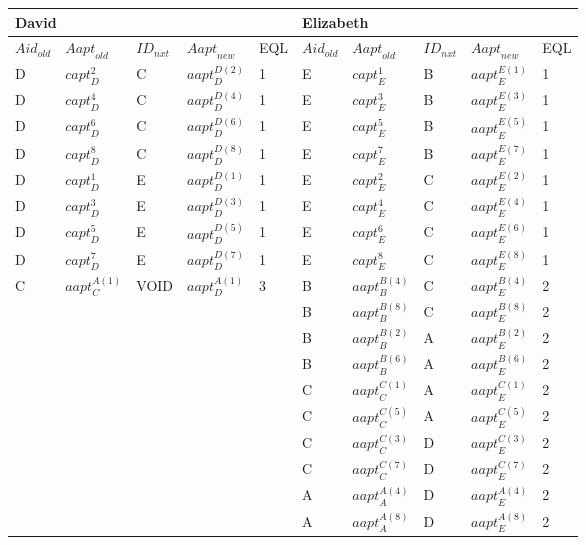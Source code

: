 \begin{tabular}{|p{0.4in}|p{0.5in}|p{0.3in}|p{0.5in}|p{0.3in}|p{0.4in}|p{0.5in}|p{0.3in}|p{0.5in}|p{0.3in}|} \hline 
\multicolumn{5}{|p{1in}|}{David} & \multicolumn{5}{|p{1.9in}|}{Elizabeth} \\ \hline 
${Aid}_{old}$ & ${Aapt}_{old}$ & ${ID}_{nxt}$ & ${Aapt}_{new}$ & EQL & ${Aid}_{old}$ & ${Aapt}_{old}$ & ${ID}_{nxt}$ & ${Aapt}_{new}$ & EQL \\ \hline 
D & ${capt}^2_D$ & C & ${aapt}^{D\left(2\right)}_D$ & 1 & E & ${capt}^1_E$ & B & ${aapt}^{E\left(1\right)}_E$ & 1 \\ \hline 
D & ${capt}^4_D$ & C & ${aapt}^{D\left(4\right)}_D$ & 1 & E & ${capt}^3_E$ & B & ${aapt}^{E\left(3\right)}_E$ & 1 \\ \hline 
D & ${capt}^6_D$ & C & ${aapt}^{D\left(6\right)}_D$ & 1 & E & ${capt}^5_E$ & B & ${aapt}^{E\left(5\right)}_E$ & 1 \\ \hline 
D & ${capt}^8_D$ & C & ${aapt}^{D\left(8\right)}_D$ & 1 & E & ${capt}^7_E$ & B & ${aapt}^{E\left(7\right)}_E$ & 1 \\ \hline 
D & ${capt}^1_D$ & E & ${aapt}^{D\left(1\right)}_D$ & 1 & E & ${capt}^2_E$ & C & ${aapt}^{E\left(2\right)}_E$ & 1 \\ \hline 
D & ${capt}^3_D$ & E & ${aapt}^{D\left(3\right)}_D$ & 1 & E & ${capt}^4_E$ & C & ${aapt}^{E\left(4\right)}_E$ & 1 \\ \hline 
D & ${capt}^5_D$ & E & ${aapt}^{D\left(5\right)}_D$ & 1 & E & ${capt}^6_E$ & C & ${aapt}^{E\left(6\right)}_E$ & 1 \\ \hline 
D & ${capt}^7_D$ & E & ${aapt}^{D\left(7\right)}_D$ & 1 & E & ${capt}^8_E$ & C & ${aapt}^{E\left(8\right)}_E$ & 1 \\ \hline 
C & ${aapt}^{A\left(1\right)}_C$ & VOID & ${aapt}^{A\left(1\right)}_D$ & 3 & B & ${aapt}^{B\left(4\right)}_B$ & C & ${aapt}^{B\left(4\right)}_E$ & 2 \\ \hline 
 &  &  &  &  & B & ${aapt}^{B\left(8\right)}_B$ & C & ${aapt}^{B\left(8\right)}_E$ & 2 \\ \hline 
 &  &  &  &  & B & ${aapt}^{B\left(2\right)}_B$ & A & ${aapt}^{B\left(2\right)}_E$ & 2 \\ \hline 
 &  &  &  &  & B & ${aapt}^{B\left(6\right)}_B$ & A & ${aapt}^{B\left(6\right)}_E$ & 2 \\ \hline 
 &  &  &  &  & C & ${aapt}^{C\left(1\right)}_C$ & A & ${aapt}^{C\left(1\right)}_E$ & 2 \\ \hline 
 &  &  &  &  & C & ${aapt}^{C\left(5\right)}_C$ & A & ${aapt}^{C\left(5\right)}_E$ & 2 \\ \hline 
 &  &  &  &  & C & ${aapt}^{C\left(3\right)}_C$ & D & ${aapt}^{C\left(3\right)}_E$ & 2 \\ \hline 
 &  &  &  &  & C & ${aapt}^{C\left(7\right)}_C$ & D & ${aapt}^{C\left(7\right)}_E$ & 2 \\ \hline 
 &  &  &  &  & A & ${aapt}^{A\left(4\right)}_A$ & D & ${aapt}^{A\left(4\right)}_E$ & 2 \\ \hline 
 &  &  &  &  & A & ${aapt}^{A\left(8\right)}_A$ & D & ${aapt}^{A\left(8\right)}_E$ & 2 \\ \hline 
\end{tabular}


